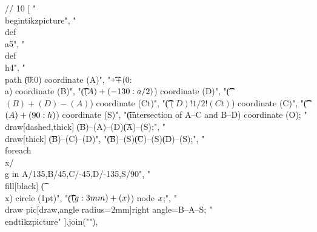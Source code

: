// 10
[
"\\begin{tikzpicture}",
"\t\\def\\a{5}",
"\t\\def\\h{4}",
"\t\\path \t(0:0) coordinate (A)",
"\t\t\t++(0:\\a) coordinate (B)",
"\t\t\t($(A)+(-130:\\a/2)$) coordinate (D)",
"\t\t\t($(B)+(D)-(A)$) coordinate (Ct)",
"\t\t\t($(D)!1/2!(Ct)$) coordinate (C)",
"\t\t\t($(A)+(90:\\h)$) coordinate (S)",
"\t\t(intersection of A--C and B--D) coordinate (O);%
"\t\\draw[dashed,thick] \t(B)--(A)--(D)\t(A)--(S);",
"\t\\draw[thick] \t\t\t(B)--(C)--(D)",
"\t\t\t\t(B)--(S)\t(C)--(S)\t(D)--(S);",
"\t\\foreach \\x/\\g in {A/135,B/45,C/-45,D/-135,S/90}",
"\t\t\t\\fill[black] \t(\\x) circle (1pt)",
"\t\t\t($(\\g:3mm)+(\\x)$) node {$\\x$};",
"\t\\draw pic[draw,angle radius=2mm]{right angle=B--A--S};%
"\\end{tikzpicture}"
].join("\n"),

